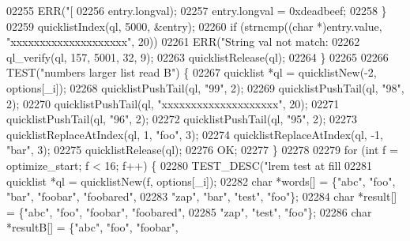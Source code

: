 \begin{DoxyCode}
{{{{{{{{{{{{{{{{{{{{{{{{{{{{{{{{{{{{{{{{{{{{{{{{{{{{{{{{{{{{{{{{{{{{{{{{{{{{{{{{02255                     ERR(\textcolor{stringliteral}{"[%
02256                         entry.longval);
02257                 entry.longval = 0xdeadbeef;
02258             \}
02259             quicklistIndex(ql, 5000, &entry);
02260             \textcolor{keywordflow}{if} (strncmp((\textcolor{keywordtype}{char} *)entry.value, \textcolor{stringliteral}{"xxxxxxxxxxxxxxxxxxxx"}, 20))
02261                 ERR(\textcolor{stringliteral}{"String val not match: %
02262             ql\_verify(ql, 157, 5001, 32, 9);
02263             quicklistRelease(ql);
02264         \}
02265 
02266         TEST(\textcolor{stringliteral}{"numbers larger list read B"}) \{
02267             quicklist *ql = quicklistNew(-2, options[\_i]);
02268             quicklistPushTail(ql, \textcolor{stringliteral}{"99"}, 2);
02269             quicklistPushTail(ql, \textcolor{stringliteral}{"98"}, 2);
02270             quicklistPushTail(ql, \textcolor{stringliteral}{"xxxxxxxxxxxxxxxxxxxx"}, 20);
02271             quicklistPushTail(ql, \textcolor{stringliteral}{"96"}, 2);
02272             quicklistPushTail(ql, \textcolor{stringliteral}{"95"}, 2);
02273             quicklistReplaceAtIndex(ql, 1, \textcolor{stringliteral}{"foo"}, 3);
02274             quicklistReplaceAtIndex(ql, -1, \textcolor{stringliteral}{"bar"}, 3);
02275             quicklistRelease(ql);
02276             OK;
02277         \}
02278 
02279         \textcolor{keywordflow}{for} (\textcolor{keywordtype}{int} f = optimize\_start; f < 16; f++) \{
02280             TEST\_DESC(\textcolor{stringliteral}{"lrem test at fill %
02281                 quicklist *ql = quicklistNew(f, options[\_i]);
02282                 \textcolor{keywordtype}{char} *words[] = \{\textcolor{stringliteral}{"abc"}, \textcolor{stringliteral}{"foo"}, \textcolor{stringliteral}{"bar"},  \textcolor{stringliteral}{"foobar"}, \textcolor{stringliteral}{"foobared"},
02283                                  \textcolor{stringliteral}{"zap"}, \textcolor{stringliteral}{"bar"}, \textcolor{stringliteral}{"test"}, \textcolor{stringliteral}{"foo"}\};
02284                 \textcolor{keywordtype}{char} *result[] = \{\textcolor{stringliteral}{"abc"}, \textcolor{stringliteral}{"foo"},  \textcolor{stringliteral}{"foobar"}, \textcolor{stringliteral}{"foobared"},
02285                                   \textcolor{stringliteral}{"zap"}, \textcolor{stringliteral}{"test"}, \textcolor{stringliteral}{"foo"}\};
02286                 \textcolor{keywordtype}{char} *resultB[] = \{\textcolor{stringliteral}{"abc"},      \textcolor{stringliteral}{"foo"}, \textcolor{stringliteral}{"foobar"},
}}}}}}}}}}}}}}}}}}}}}}}}}}}}}}}}}}}}}}}}}}}}}}}}}}}}}}}}}}}}}}}}}}}}}}}}}}}}}}}}}}}
\end{DoxyCode}
